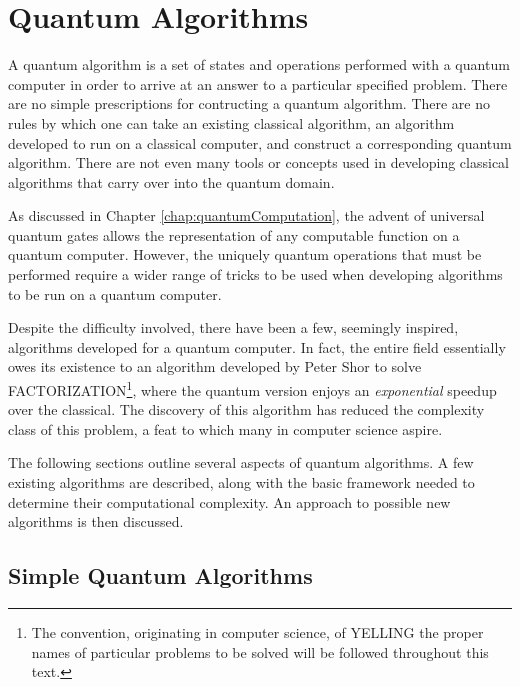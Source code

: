 

\chapter{Quantum Algorithms}
\label{chap:quantumAlgorithms}
%

A quantum algorithm is a set of states and operations performed
with a quantum computer in order to arrive at an answer to a particular
specified problem.
There are no simple prescriptions for contructing a quantum algorithm.
There are no rules by which one can take an existing classical algorithm,
an algorithm developed to run on a classical computer, and construct
a corresponding quantum algorithm.  There are not even many tools or concepts
used in developing classical algorithms that carry over into the quantum
domain.

As discussed in Chapter \ref{chap:quantumComputation}, 
the advent of universal quantum gates
allows the representation of any computable function on a 
quantum computer.  However, the uniquely quantum operations that 
must be performed 
require a wider range of tricks to be used when developing
algorithms to be run on a quantum computer.

Despite the difficulty involved, there have been a few, seemingly
inspired, algorithms developed for a quantum computer.
In fact, the entire field essentially owes its existence to 
an algorithm developed by Peter Shor\cite{Shor:94,Shor:00}
to solve FACTORIZATION\footnote{The convention, originating in computer 
science, of YELLING the proper names of particular problems to be solved 
will be followed throughout this text.}, where the quantum version 
enjoys an \emph{exponential} speedup over the classical.  
The discovery of this algorithm has reduced the complexity class of 
this problem, a feat to which many in computer science aspire.

The following sections outline several aspects of quantum
algorithms.  A few existing algorithms are described, along
with the basic framework needed to determine their computational
complexity.  An approach to possible new algorithms is then 
discussed.

\section{Simple Quantum Algorithms}

